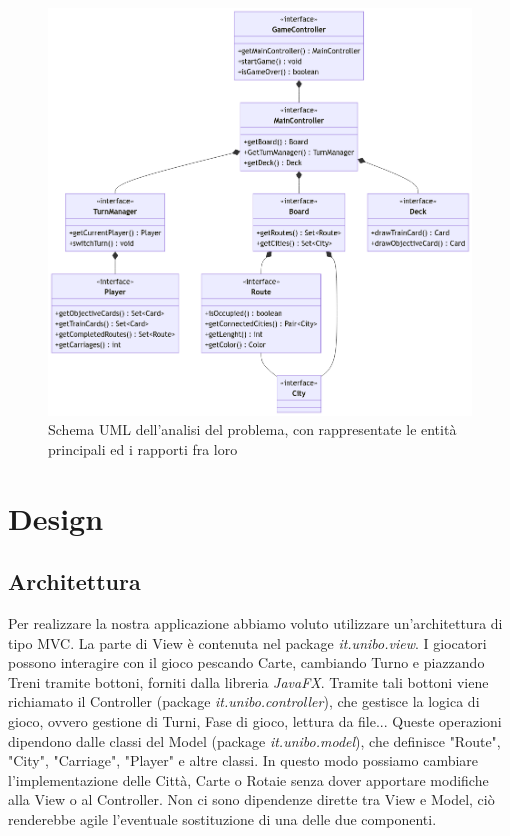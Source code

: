 \documentclass[a4paper,12pt]{report}
\begin{document}
\begin{figure}[H]
\centering{}
\includegraphics[scale=0.5]{UMLdomain.png}
\caption{Schema UML dell'analisi del problema, con rappresentate le entità principali ed i rapporti fra loro}
\label{img:analysisGraph}
\end{figure}

\chapter{Design}
\section{Architettura}
Per realizzare la nostra applicazione abbiamo voluto utilizzare un'architettura di tipo MVC. La parte di View è contenuta nel package \textit{it.unibo.view}. I giocatori possono interagire con il gioco pescando Carte, cambiando Turno e piazzando Treni tramite bottoni, forniti dalla libreria \textit{JavaFX}.  Tramite tali bottoni viene richiamato il Controller (package \textit{it.unibo.controller}), che gestisce la logica di gioco, ovvero gestione di Turni, Fase di gioco, lettura da file... Queste operazioni dipendono dalle classi del Model (package \textit{it.unibo.model}), che definisce "Route", "City", "Carriage", "Player" e altre classi. In questo modo possiamo cambiare l'implementazione delle Città, Carte o Rotaie senza dover apportare modifiche alla View o al Controller. Non ci sono dipendenze dirette tra View e Model, ciò renderebbe agile l'eventuale sostituzione di una delle due componenti.
\end{document}
